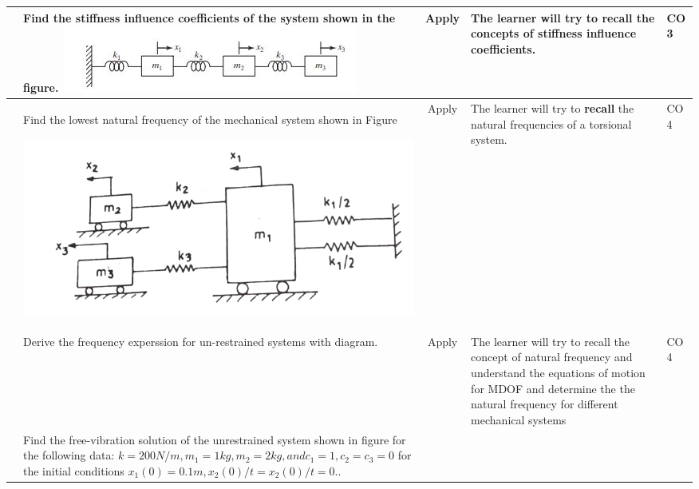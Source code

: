 \documentclass[11pt,paper=a4,answers]{exam}
\begin{document}
\begin{flushleft}
\begin{longtable}{|>{\centering\arraybackslash}p{0.8cm}  | >{\raggedright\arraybackslash}p{6.5cm}  | c | >{\raggedright\arraybackslash}p{5cm} |>{\centering\arraybackslash}p{1cm}|}
	\hline
1&	Find the stiffness influence coefficients of the system shown in the figure.
\includegraphics[scale=0.6]{15.jpg}
&	Apply&	The learner will try to \textbf{recall} the concepts of stiffness influence coefficients. &	CO 3\\
\hline
8&	Find the lowest natural frequency of the mechanical system shown in Figure 

\includegraphics[scale=0.2]{6_14.png}
&	Apply&	The learner will try to \textbf{recall} the natural frequencies of a torsional system. &	CO 4\\
	\hline 
9& Derive the frequency experssion for un-restrained systems with diagram.&	Apply&	The learner will try to recall the concept of natural frequency and understand the equations of motion for MDOF and determine the the natural frequency for different mechanical systems &	CO 4\\
	\hline 
10 & Find the free-vibration solution of the unrestrained system shown in figure for the following
data: $k= 200 N/m, m_1= 1 kg, m_2= 2 kg, and c_1=1, c_2=c_3=0 $ for the initial conditions $ x_1(0)= 0.1 m, x_2(0)/t=x_2(0)/t=0. $. 


\end{longtable}
\end{flushleft}
\end{document}
